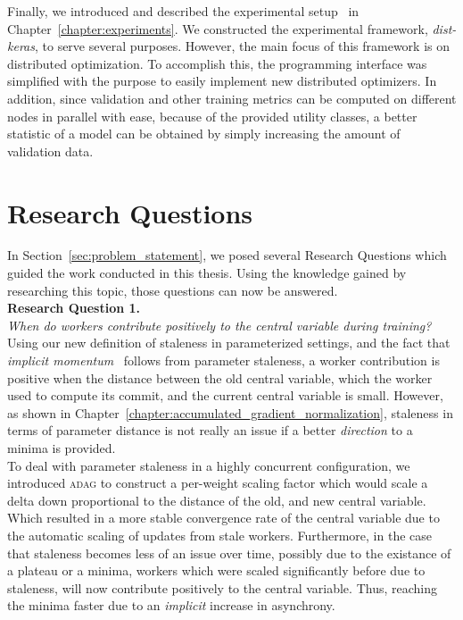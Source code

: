 Finally, we introduced and described the experimental setup~\cite{dist_keras} in Chapter~\ref{chapter:experiments}. We constructed the experimental framework, \emph{dist-keras}, to serve several purposes. However, the main focus of this framework is on distributed optimization. To accomplish this, the programming interface was simplified with the purpose to easily implement new distributed optimizers. In addition, since validation and other training metrics can be computed on different nodes in parallel with ease, because of the provided utility classes, a better statistic of a model can be obtained by simply increasing the amount of validation data.

\section{Research Questions}
\label{sec:conclusion_research_questions}

In Section~\ref{sec:problem_statement}, we posed several Research Questions which guided the work conducted in this thesis. Using the knowledge gained by researching this topic, those questions can now be answered.\\

\noindent \textbf{Research Question 1.}\\
\emph{When do workers contribute positively to the central variable during training?}\\

Using our new definition of staleness in parameterized settings, and the fact that \emph{implicit momentum}~\cite{implicitmomentum} follows from parameter staleness, a worker contribution is positive when the distance between the old central variable, which the worker used to compute its commit, and the current central variable is small. However, as shown in Chapter~\ref{chapter:accumulated_gradient_normalization}, staleness in terms of parameter distance is not really an issue if a better \emph{direction} to a minima is provided.\\

To deal with parameter staleness in a highly concurrent configuration, we introduced \textsc{adag} to construct a per-weight scaling factor which would scale a delta down proportional to the distance of the old, and new central variable. Which resulted in a more stable convergence rate of the central variable due to the automatic scaling of updates from stale workers. Furthermore, in the case that staleness becomes less of an issue over time, possibly due to the existance of a plateau or a minima, workers which were scaled significantly before due to staleness, will now contribute positively to the central variable. Thus, reaching the minima faster due to an \emph{implicit} increase in asynchrony.\\

